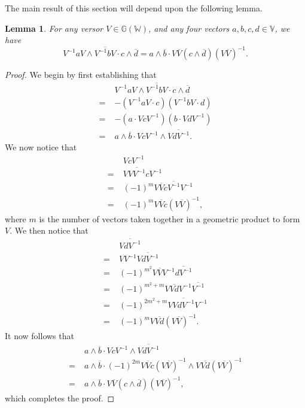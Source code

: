 \documentclass{birkjour}
\newtheorem{lem}[thm]{Lemma}
\theoremstyle{definition}
\theoremstyle{remark}
\numberwithin{equation}{section}
\newcommand{\G}{\mathbb{G}}
\newcommand{\V}{\mathbb{V}}
\newcommand{\W}{\mathbb{W}}
\begin{document}
The main result of this section will depend upon the following lemma.
\begin{lem}\label{lma_versor_transfer}
For any versor $V\in\G(\W)$, and any four vectors $a,b,c,d\in\V$, we have
\begin{equation}
V^{-1}aV\wedge\overline{V^{-1}bV}\cdot c\wedge\overline{d} =
a\wedge\overline{b}\cdot V\overline{V}(c\wedge\overline{d})(V\overline{V})^{-1}.
\end{equation}
\end{lem}
\begin{proof}
We begin by first establishing that
\begin{align}
 & V^{-1}aV\wedge\overline{V^{-1}bV}\cdot c\wedge\overline{d} \\
=\;& -(V^{-1}aV\cdot c)(V^{-1}bV\cdot d) \\
=\;& -(a\cdot VcV^{-1})(b\cdot VdV^{-1}) \\
=\;& a\wedge\overline{b}\cdot VcV^{-1}\wedge\overline{VdV^{-1}}.
\end{align}
We now notice that
\begin{align}
& VcV^{-1} \\
=\;& V\overline{VV^{-1}}cV^{-1} \\
=\;& (-1)^m V\overline{V}c\overline{V^{-1}}V^{-1} \\
=\;& (-1)^m V\overline{V}c(V\overline{V})^{-1},
\end{align}
where $m$ is the number of vectors taken together in a geometric
product to form $V$.  We then notice that
\begin{align}
& \overline{VdV^{-1}} \\
=\;& VV^{-1}\overline{VdV^{-1}} \\
=\;& (-1)^{m^2}V\overline{V}V^{-1}\overline{dV^{-1}} \\
=\;&(-1)^{m^2+m}V\overline{Vd}V^{-1}\overline{V^{-1}} \\
=\;&(-1)^{2m^2+m}V\overline{VdV^{-1}}V^{-1} \\
=\;&(-1)^mV\overline{Vd}(V\overline{V})^{-1}.
\end{align}
It now follows that
\begin{align}
 & a\wedge\overline{b}\cdot VcV^{-1}\wedge\overline{VdV^{-1}} \\
=\;& a\wedge\overline{b}\cdot (-1)^{2m}V\overline{V}c(V\overline{V})^{-1}\wedge V\overline{Vd}(V\overline{V})^{-1} \\
=\;& a\wedge\overline{b}\cdot V\overline{V}(c\wedge\overline{d})(V\overline{V})^{-1},
\end{align}
which completes the proof.
\end{proof}
\end{document}

